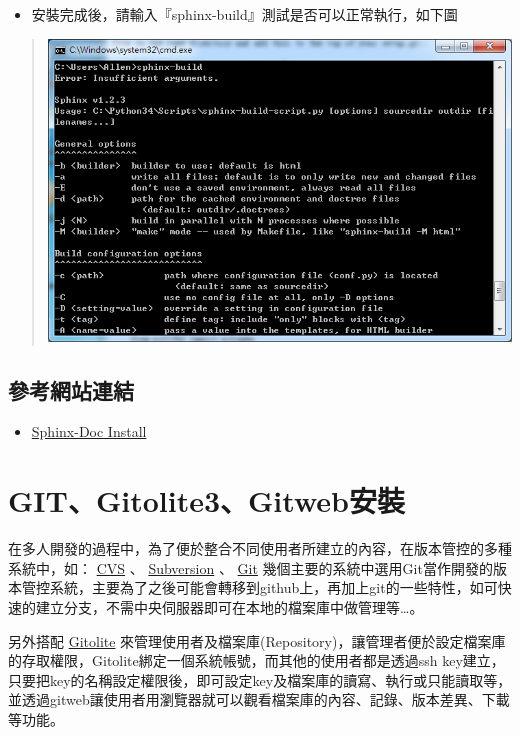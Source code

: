 \documentclass[letterpaper,10pt,english]{sphinxmanual}
\begin{document}
\begin{itemize}
\item {} 
安裝完成後，請輸入『sphinx-build』測試是否可以正常執行，如下圖

\end{itemize}
\begin{quote}

\includegraphics{Python-Sphinx-003.png}
\end{quote}


\section{參考網站連結}
\label{_doc/sphinx-doc-win/index:id4}\begin{itemize}
\item {} 
\href{http://sphinx-doc.org/install.html}{Sphinx-Doc Install}

\end{itemize}


\chapter{GIT、Gitolite3、Gitweb安裝}
\label{_doc/git/index::doc}\label{_doc/git/index:gitgitolite3gitweb}
在多人開發的過程中，為了便於整合不同使用者所建立的內容，在版本管控的多種系統中，如： \href{http://www.nongnu.org/cvs/}{CVS} 、 \href{http://subversion.apache.org/}{Subversion} 、 \href{http://git-scm.com/}{Git} 幾個主要的系統中選用Git當作開發的版本管控系統，主要為了之後可能會轉移到github上，再加上git的一些特性，如可快速的建立分支，不需中央伺服器即可在本地的檔案庫中做管理等…。

另外搭配 \href{http://gitolite.com}{Gitolite} 來管理使用者及檔案庫(Repository)，讓管理者便於設定檔案庫的存取權限，Gitolite綁定一個系統帳號，而其他的使用者都是透過ssh key建立，只要把key的名稱設定權限後，即可設定key及檔案庫的讀寫、執行或只能讀取等，並透過gitweb讓使用者用瀏覽器就可以觀看檔案庫的內容、記錄、版本差異、下載等功能。
\end{document}
